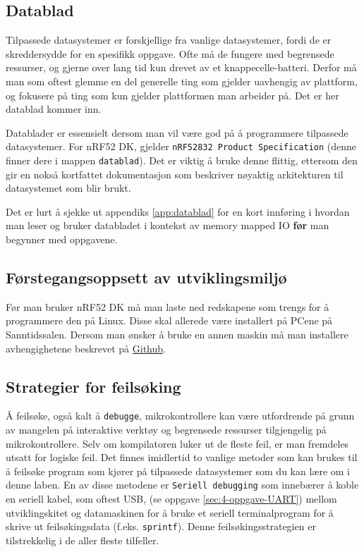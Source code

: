 \begin{alphasection}
\subsection{Datablad}


Tilpassede datasystemer er forskjellige fra vanlige datasystemer, fordi de er skreddersydde for en spesifikk oppgave. Ofte må de fungere med begrensede ressurser, og gjerne over lang tid kun drevet av et knappecelle-batteri. Derfor må man som oftest glemme en del generelle ting som gjelder uavhengig av plattform, og fokusere på ting som kun gjelder plattformen man arbeider på. Det er her datablad kommer inn.

Datablader er essensielt dersom man vil være god på å programmere tilpassede datasystemer. For nRF52 DK, gjelder \texttt{nRF52832 Product Specification} (denne finner dere i mappen \verb|datablad|). Det er viktig å bruke denne flittig, ettersom den gir en nokså kortfattet dokumentasjon som beskriver nøyaktig arkitekturen til datasystemet som blir brukt.

Det er lurt å sjekke ut appendiks \ref{app:datablad} for en kort innføring i hvordan man leser og bruker databladet i kontekst av memory mapped IO {\bf før} man begynner med oppgavene.




\subsection{Førstegangsoppsett av utviklingsmiljø}


Før man bruker nRF52 DK må man laste ned redskapene som trengs for å programmere den på Linux. Disse skal allerede være installert på PCene på Sanntidssalen. Dersom man ønsker å bruke en annen maskin må man installere avhengighetene beskrevet på \href{https://github.com/ITK-TTK4235/nrf52dk-environment}{Github}.



\subsection{Strategier for feilsøking}

Å feilsøke, også kalt å \verb|debugge|, mikrokontrollere kan være utfordrende på grunn av mangelen på interaktive verktøy og begrensede ressurser tilgjengelig på mikrokontrollere. Selv om kompilatoren luker ut de fleste feil, er man fremdeles utsatt for logiske feil. Det finnes imidlertid to vanlige metoder som kan brukes til å feilsøke program som kjører på tilpassede datasystemer som du kan lære om i denne laben. En av disse metodene er \verb|Seriell debugging| som innebærer å koble en seriell kabel, som oftest USB, (se oppgave \ref{sec:4-oppgave-UART}) mellom utviklingskitet og datamaskinen for å bruke et seriell terminalprogram for å skrive ut feilsøkingsdata (f.eks. \verb|sprintf|). Denne feilsøkingsstrategien er tilstrekkelig i de aller fleste tilfeller. 


\end{alphasection}
